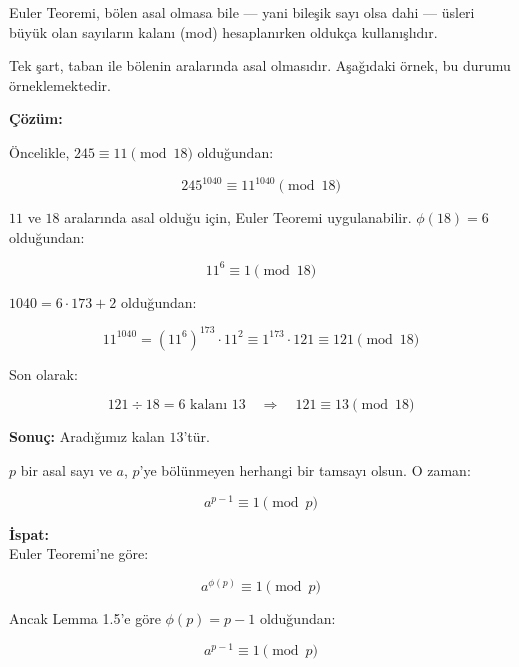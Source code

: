 \vspace{2em}

\begin{tcolorbox}[colback=blue!3, colframe=blue!70!black, title=\textbf{Euler Teoreminin Uygulaması Üzerine Not}, fonttitle=\bfseries, sharp corners]
Euler Teoremi, bölen asal olmasa bile — yani bileşik sayı olsa dahi — üsleri büyük olan sayıların kalanı (mod) hesaplanırken oldukça kullanışlıdır. 

Tek şart, taban ile bölenin aralarında asal olmasıdır. Aşağıdaki örnek, bu durumu örneklemektedir.
\end{tcolorbox}

\vspace{2em}

\begin{tcolorbox}[colback=gray!5, colframe=black, title=\textbf{Örnek 1.25: $245^{1040}$ ifadesinin 18 ile bölümünden kalanı bulunuz}, fonttitle=\bfseries, sharp corners]

\textbf{Çözüm:}

Öncelikle, $245 \equiv 11 \pmod{18}$ olduğundan:

\[
245^{1040} \equiv 11^{1040} \pmod{18}
\]

$11$ ve $18$ aralarında asal olduğu için, Euler Teoremi uygulanabilir. $\phi(18) = 6$ olduğundan:

\[
11^6 \equiv 1 \pmod{18}
\]

$1040 = 6 \cdot 173 + 2$ olduğundan:

\[
11^{1040} = (11^6)^{173} \cdot 11^2 \equiv 1^{173} \cdot 121 \equiv 121 \pmod{18}
\]

Son olarak:

\[
121 \div 18 = 6 \text{ kalanı } 13 \quad \Rightarrow \quad 121 \equiv 13 \pmod{18}
\]

\textbf{Sonuç:} Aradığımız kalan $13$'tür.

\end{tcolorbox}

\vspace{2em}

\begin{tcolorbox}[colback=blue!5, colframe=blue!50!black, title=\textbf{Sonuç 1.26 (Fermat'nın Küçük Teoremi)}, fonttitle=\bfseries, sharp corners]

$p$ bir asal sayı ve $a$, $p$'ye bölünmeyen herhangi bir tamsayı olsun. O zaman:

\[
a^{p - 1} \equiv 1 \pmod{p}
\]

\textbf{İspat:} \\
Euler Teoremi'ne göre:

\[
a^{\phi(p)} \equiv 1 \pmod{p}
\]

Ancak Lemma 1.5'e göre $\phi(p) = p - 1$ olduğundan:

\[
a^{p - 1} \equiv 1 \pmod{p}
\]
\end{tcolorbox}

